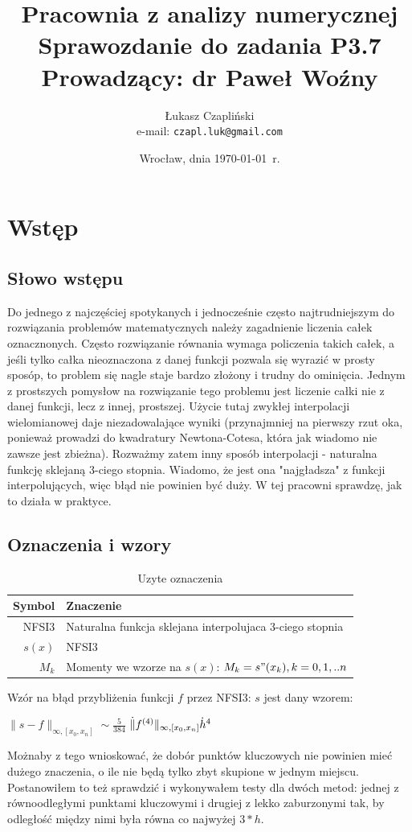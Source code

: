 \documentclass[11pt,wide]{mwart}
\title{{\textbf{Pracownia z analizy numerycznej\\}}
       {\Large Sprawozdanie do zadania \textbf{P3.7}\\}
       {\large Prowadzący: dr Paweł Woźny}}
\author{Łukasz Czapliński\\  e-mail: \texttt{czapl.luk@gmail.com}}
\date{Wrocław, dnia \today\ r.}
\begin{document}
\thispagestyle{empty}
\maketitle
\newpage
\section{Wstęp}
\subsection{Słowo wstępu}
Do jednego z najczęściej spotykanych i jednocześnie często najtrudniejszym do rozwiązania problemów matematycznych należy zagadnienie liczenia całek oznacznonych. Często rozwiązanie równania wymaga policzenia takich całek, a jeśli tylko całka nieoznaczona z danej funkcji pozwala się wyrazić w prosty sposóp, to problem się nagle staje bardzo złożony i trudny do ominięcia. Jednym z prostszych pomysłow na rozwiązanie tego problemu jest liczenie całki nie z danej funkcji, lecz z innej, prostszej. Użycie tutaj zwykłej interpolacji wielomianowej daje niezadowalające wyniki (przynajmniej na pierwszy rzut oka, ponieważ prowadzi do kwadratury Newtona-Cotesa, która jak wiadomo nie zawsze jest zbieżna). Rozważmy zatem inny sposób interpolacji - naturalna funkcję sklejaną 3-ciego stopnia. Wiadomo, że jest ona "najgładsza" z funkcji interpolujących, więc błąd nie powinien być duży. W tej pracowni sprawdzę, jak to działa w praktyce.
\subsection{Oznaczenia i wzory}
\begin{table}[!h]
  \centering
  \begin{tabular}{r | l}
    \hline
    Symbol & Znaczenie \\
    \hline
    NFSI3 & Naturalna funkcja sklejana interpolujaca 3-ciego stopnia \\
    $s(x)$ & NFSI3 \\
    $M_k$ & Momenty we wzorze na $s(x)$: $M_k=s"(x_k), k=0,1,..n$\\
    \hline
  \end{tabular}
  \caption{Uzyte oznaczenia}
\end{table}
Wzór na błąd przybliżenia funkcji $f$  przez NFSI3: $s$ jest dany wzorem:\\
\begin{center}
  $\lVert{s-f}\rVert_{\infty,[x_0,x_n]}\sim\frac{5}{384}$ $\dot\lVert{f^{(4)}}\rVert_{\infty,[x_0,x_n]}\dot h^4$
  \label{WZOR}
\end{center}
Możnaby z tego wnioskować, że dobór punktów kluczowych nie powinien mieć dużego znaczenia, o ile nie będą tylko zbyt skupione w jednym miejscu. Postanowiłem to też sprawdzić i wykonywałem testy dla dwóch metod: jednej z równoodległymi punktami kluczowymi i drugiej z lekko zaburzonymi tak, by odległość między nimi była równa co najwyżej $3*h$.
\end{document}
